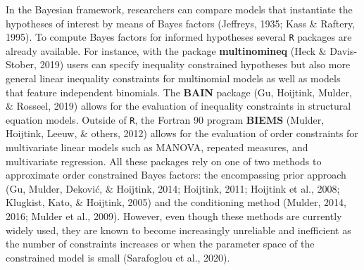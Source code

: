 \documentclass[
  english,
  man,floatsintext]{apa6}
\begin{document}
In the Bayesian framework, researchers can compare models that instantiate the hypotheses of interest by means of Bayes factors (Jeffreys, 1935; Kass \& Raftery, 1995). To compute Bayes factors for informed hypotheses several \texttt{R} packages are already available. For instance, with the package \textbf{multinomineq} (Heck \& Davis-Stober, 2019) users can specify inequality constrained hypotheses but also more general linear inequality constraints for multinomial models as well as models that feature independent binomials. The \textbf{BAIN} package (Gu, Hoijtink, Mulder, \& Rosseel, 2019) allows for the evaluation of inequality constraints in structural equation models. Outside of \texttt{R}, the Fortran 90 program \textbf{BIEMS} (Mulder, Hoijtink, Leeuw, \& others, 2012) allows for the evaluation of order constraints for multivariate linear models such as MANOVA, repeated measures, and multivariate regression. All these packages rely on one of two methods to approximate order constrained Bayes factors: the encompassing prior approach (Gu, Mulder, Deković, \& Hoijtink, 2014; Hoijtink, 2011; Hoijtink et al., 2008; Klugkist, Kato, \& Hoijtink, 2005) and the conditioning method (Mulder, 2014, 2016; Mulder et al., 2009). However, even though these methods are currently widely used, they are known to become increasingly unreliable and inefficient as the number of constraints increases or when the parameter space of the constrained model is small (Sarafoglou et al., 2020).
\end{document}
